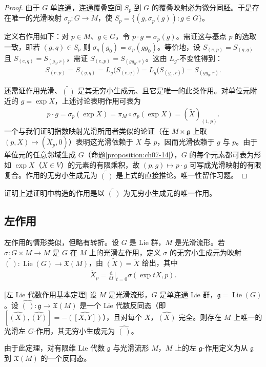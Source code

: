 \documentclass[../../main.tex]{subfiles}
\begin{document}
\begin{proof}
由于 $G$ 单连通，连通覆叠空间 $S_p$ 到 $G$ 的覆叠映射必为微分同胚。于是存在唯一的光滑映射 $\sigma_p\colon G\to M$，使 $S_p=\{(g,\sigma_p(g))\colon g\in G\}$。

定义右作用如下：对 $p\in M$、$g\in G$，令 $p\cdot g=\sigma_p(g)$。需证这与基点 $p$ 的选取一致，即若 $(g,q)\in S_p$ 则 $\sigma_q(g_0)=\sigma_p(gg_0)$。等价地，设 $S_{(e,p)}=S_{(g,q)}$ 且 $S_{(e,q)}=S_{(g_0,r)}$，需证 $S_{(e,p)}=S_{(gg_0,r)}$。这由 $L_g$-不变性得到：
\begin{align*}
S_{(e,p)}=S_{(g,q)}=L_g\bigl(S_{(e,q)}\bigr)=L_g\bigl(S_{(g_0,r)}\bigr)=S_{(gg_0,r)}.
\end{align*}

还需证作用光滑、$\widetilde{(\,)}$ 是其无穷小生成元、且它是唯一的此类作用。对单位元附近的 $g=\exp X$，上述讨论表明作用可表为
\begin{align}
p\cdot g=\sigma_p(\exp X)=\pi_M\circ\sigma_p(\exp X)=(\widetilde X)_{(1,p)}.
\end{align}
一个与我们证明指数映射光滑所用者类似的论证（在 $M\times\mathfrak g$ 上取 $(p,X)\mapsto(\widetilde X_p,0)$）表明这光滑依赖于 $X$ 与 $p$，因而光滑依赖于 $g$ 与 $p$。由于单位元的任意邻域生成 $G$（命题\cref{proposition:ch07-14}），$G$ 的每个元素都可表为形如 $\exp X$（$X\in V$）的元素的有限乘积，故 $(p,g)\mapsto p\cdot g$ 可写成光滑映射的有限复合。作用的无穷小生成元为 $\widetilde{(\,)}$ 是上式的直接推论。唯一性留作习题。
\end{proof}

\begin{exercise}\label{exercise:ch20-17}
证明上述证明中构造的作用是以 $\widetilde{(\,)}$ 为无穷小生成元的唯一作用。
\end{exercise}

\subsection{左作用}

左作用的情形类似，但略有转折。设 $G$ 是 Lie 群，$M$ 是光滑流形。若 $\sigma\colon G\times M\to M$ 是 $G$ 在 $M$ 上的光滑左作用，定义 $\sigma$ 的无穷小生成元为映射 $\widetilde{(\,)}\colon\operatorname{Lie}(G)\to\mathfrak X(M)$，由 $\widetilde{(X)}=\widetilde X$ 给出，其中
\begin{align*}
\widetilde X_p=\frac{\mathrm{d}}{\mathrm{d}t}\bigg|_{t=0}\sigma(\exp tX,p).
\end{align*}

\begin{theorem}{[左 Lie 代数作用基本定理]}\label{theorem:ch20-左作用基本定理}
设 $M$ 是光滑流形，$G$ 是单连通 Lie 群，$\mathfrak g=\operatorname{Lie}(G)$。设 $\widehat{(\,)}\colon\mathfrak g\to\mathfrak X(M)$ 是一个 Lie 代数反同态（即 $[\widehat{(X)},\widehat{(Y)}]=-\widehat{([X,Y])}$），且对每个 $X$，$\widehat{(X)}$ 完全。则存在 $M$ 上唯一的光滑左 $G$-作用，其无穷小生成元为 $\widehat{(\,)}$。
\end{theorem}

由于此定理，对有限维 Lie 代数 $\mathfrak g$ 与光滑流形 $M$，$M$ 上的左 $\mathfrak g$-作用定义为从 $\mathfrak g$ 到 $\mathfrak X(M)$ 的一个反同态。
\end{document}
